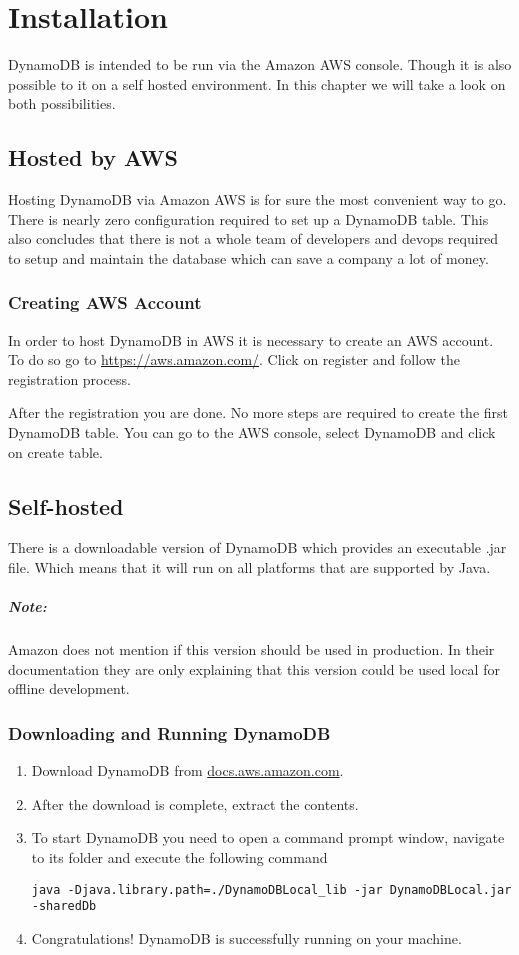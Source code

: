 \chapter{Installation}
DynamoDB is intended to be run via the Amazon AWS console. Though it is also possible to it on a self hosted environment. In this chapter we will take a look on both possibilities.

\section{Hosted by AWS}
Hosting DynamoDB via Amazon AWS is for sure the most convenient way to go. There is nearly zero configuration required to set up a DynamoDB table. This also concludes that there is not a whole team of developers and devops required to setup and maintain the database which can save a company a lot of money.

\subsection{Creating AWS Account}
In order to host DynamoDB in AWS it is necessary to create an AWS account. To do so go to \hyperref[awswebsite]{https://aws.amazon.com/}. Click on register and follow the registration process.

After the registration you are done. No more steps are required to create the first DynamoDB table. You can go to the AWS console, select DynamoDB and click on create table.

\section{Self-hosted}
There is a downloadable version of DynamoDB which provides an executable .jar file. Which means that it will run on all platforms that are supported by Java.\cite{wwwdynamodblocal}
\paragraph{Note:}Amazon does not mention if this version should be used in production. In their documentation they are only explaining that this version could be used local for offline development.

\subsection{Downloading and Running DynamoDB}
\begin{enumerate}
	\item Download DynamoDB from \hyperref[awsdocswebsite]{docs.aws.amazon.com}.
	\item After the download is complete, extract the contents.
	\item To start DynamoDB you need to open a command prompt window, navigate to its folder and execute the following command
		\begin{lstlisting}[]
java -Djava.library.path=./DynamoDBLocal_lib -jar DynamoDBLocal.jar -sharedDb
		\end{lstlisting}
	\item Congratulations! DynamoDB is successfully running on your machine.
\end{enumerate}
